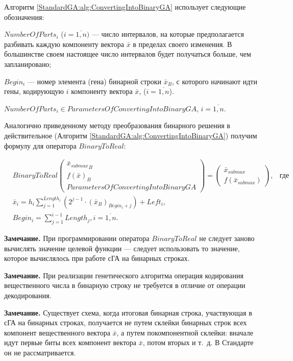 \singlespacing

Алгоритм \ref{StandardGA:alg:ConvertingIntoBinaryGA} использует следующие обозначения:

$NumberOfParts_i  $ ($ i=\overline{1,n}) $ --- число интервалов, на которые предполагается разбивать каждую компоненту вектора $ \bar{x}$ в пределах своего изменения. В большинстве своем настоящее число интервалов будет получаться больше, чем запланировано;

$ Begin_i $ --- номер элемента (гена) бинарной строки $ \bar{x}_B $, с которого начинают идти гены, кодирующую $ i $ компоненту вектора $ \bar{x} $, ($ i=\overline{1,n} $).

$NumberOfParts_i \in ParametersOfConvertingIntoBinaryGA $, $i=\overline{1,n}$.

Аналогично приведенному методу преобразования бинарного решения в действительное (Алгоритм \ref{StandardGA:alg:ConvertingIntoBinaryGA}) получим формулу для оператора $ BinaryToReal $:

\begin{align}
\label{StandardGA:eq:BinaryToReal}
&BinaryToReal\left( \begin{array}{c}\bar{x}{{}_{submax}}_B \\f\left(\bar{x} \right)_B \\ParametersOfConvertingIntoBinaryGA
\end{array}\right) =\left( \begin{array}{c}\bar{x}_{submax} \\f\left(\bar{x}_{submax} \right)
\end{array}\right),&\text{где } \\
&\bar{x}_i=h_i \sum_{j=1}^{Length_i} \left( 2^{j-1}\cdot {\left( \bar{x}_B\right) }_{Begin_i+j} \right)+Left_i,\nonumber \\
& Begin_i =\sum_{j=1}^{i-1}Length_j, i=\overline{1,n}.\nonumber
\end{align}

\textbf{Замечание.} При программировании оператора $ BinaryToReal $ не следует заново вычислять значение целевой функции --- следует использовать то значение, которое вычислялось при работе сГА на бинарных строках.

\textbf{Замечание.} При реализации генетического алгоритма операция кодирования вещественного числа в бинарную строку не требуется в отличие от операции декодирования.

\textbf{Замечание.} Существует схема, когда итоговая бинарная строка, участвующая в сГА на бинарных строках, получается не путем склейки бинарных строк всех компонент вещественного вектора $\bar{x}$, а путем покомпонентной склейки: вначале идут первые биты всех компонент вектора  $\bar{x}$, потом вторых и т.~д. В Стандарте он не рассматривается.

